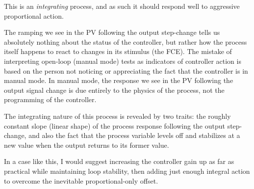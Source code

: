 





This is an {\it integrating} process, and as such it should respond well to aggressive proportional action.  

\vskip 10pt

The ramping we see in the PV following the output step-change tells us absolutely nothing about the status of the controller, but rather how the process itself happens to react to changes in its stimulus (the FCE).  The mistake of interpreting open-loop (manual mode) tests as indicators of controller action is based on the person not noticing or appreciating the fact that the controller is in manual mode.  In manual mode, the response we see in the PV following the output signal change is due entirely to the physics of the process, not the programming of the controller.







The integrating nature of this process is revealed by two traits: the roughly constant slope (linear shape) of the process response following the output step-change, and also the fact that the process variable levels off and stabilizes at a new value when the output returns to its former value.

In a case like this, I would suggest increasing the controller gain up as far as practical while maintaining loop stability, then adding just enough integral action to overcome the inevitable proportional-only offset.





